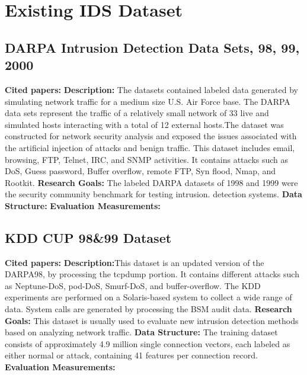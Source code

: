 \section{Existing IDS Dataset}






\subsection{DARPA Intrusion Detection Data Sets, 98, 99, 2000}
\textbf{Cited papers:} \newline
\textbf{Description:} The datasets contained labeled data generated by simulating network traffic for a medium size U.S. Air Force base. The DARPA data sets represent the traffic of a relatively small network of 33 live and simulated hosts interacting with a total of 12 external hosts.The dataset was constructed for network security analysis and exposed the issues associated with the artificial injection of attacks and benign traffic. This dataset includes email, browsing, FTP, Telnet, IRC, and SNMP activities. It contains attacks such as DoS, Guess password, Buffer overflow, remote FTP, Syn flood, Nmap, and Rootkit.\newline
\textbf{Research Goals:} The labeled DARPA datasets of 1998 and 1999 were the security community benchmark for testing intrusion.
detection systems. \newline
\textbf{Data Structure:} \newline
\textbf{Evaluation Measurements:} \newline






\subsection{KDD CUP 98\&99 Dataset}
\textbf{Cited papers:}\newline
\textbf{Description:}This dataset is an updated version of the DARPA98,
by processing the tcpdump portion. It contains different attacks such as Neptune-DoS, pod-DoS, Smurf-DoS, and buffer-overflow. The KDD experiments are performed on a Solaris-based system to collect a wide range of data. System calls are generated by processing the BSM audit data. 
\textbf{Research Goals:} This dataset is usually used to evaluate new intrusion detection methods based on analyzing network traffic. \newline
\textbf{Data Structure:} The training dataset consists of approximately 4.9 million
single connection vectors, each labeled as either normal or attack, containing 41 features per connection record. \newline
\textbf{Evaluation Measurements:} \newline








